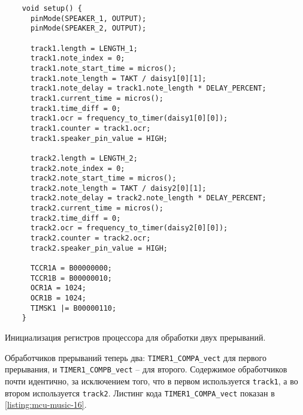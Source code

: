 \documentclass[../sparc.tex]{subfiles}
\begin{document}
\begin{listing}[H]
  \begin{verbatim}
    void setup() {
      pinMode(SPEAKER_1, OUTPUT);
      pinMode(SPEAKER_2, OUTPUT);

      track1.length = LENGTH_1;
      track1.note_index = 0;
      track1.note_start_time = micros();
      track1.note_length = TAKT / daisy1[0][1];
      track1.note_delay = track1.note_length * DELAY_PERCENT;
      track1.current_time = micros();
      track1.time_diff = 0;
      track1.ocr = frequency_to_timer(daisy1[0][0]);
      track1.counter = track1.ocr;
      track1.speaker_pin_value = HIGH;

      track2.length = LENGTH_2;
      track2.note_index = 0;
      track2.note_start_time = micros();
      track2.note_length = TAKT / daisy2[0][1];
      track2.note_delay = track2.note_length * DELAY_PERCENT;
      track2.current_time = micros();
      track2.time_diff = 0;
      track2.ocr = frequency_to_timer(daisy2[0][0]);
      track2.counter = track2.ocr;
      track2.speaker_pin_value = HIGH;

      TCCR1A = B00000000;
      TCCR1B = B00000010;
      OCR1A = 1024;
      OCR1B = 1024;
      TIMSK1 |= B00000110;
    }
  \end{verbatim}
  \caption{Инициализация регистров процессора для обработки двух прерываний.}
  \label{listing:mcu-music-16}
\end{listing}

Обработчиков прерываний теперь два: \texttt{TIMER1_COMPA_vect} для
первого прерывания, и \texttt{TIMER1_COMPB_vect} -- для второго.
Содержимое обработчиков почти идентично, за исключением того, что в первом
используется \texttt{track1}, а во втором используется
\texttt{track2}.  Листинг кода \texttt{TIMER1_COMPA_vect}
показан в \ref{listing:mcu-music-16}.
\end{document}
